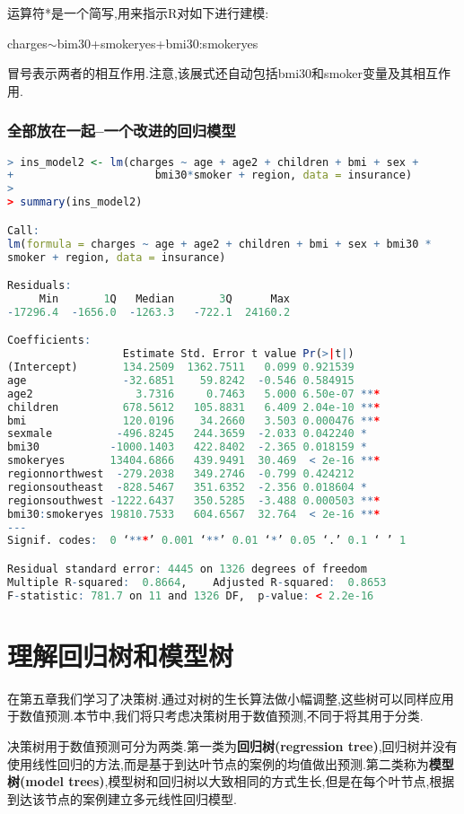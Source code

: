 \documentclass[11pt,a4paper,oneside]{book}
\begin{document}
运算符*是一个简写,用来指示R对如下进行建模:

charges$\sim$bim30+smokeryes+bmi30:smokeryes

冒号表示两者的相互作用.注意,该展式还自动包括bmi30和smoker变量及其相互作用.

\subsubsection{全部放在一起--一个改进的回归模型}

\begin{lstlisting}[language=r]
> ins_model2 <- lm(charges ~ age + age2 + children + bmi + sex +
+                      bmi30*smoker + region, data = insurance)
> 
> summary(ins_model2)

Call:
lm(formula = charges ~ age + age2 + children + bmi + sex + bmi30 * 
smoker + region, data = insurance)

Residuals:
     Min       1Q   Median       3Q      Max 
-17296.4  -1656.0  -1263.3   -722.1  24160.2 

Coefficients:
                  Estimate Std. Error t value Pr(>|t|)    
(Intercept)       134.2509  1362.7511   0.099 0.921539    
age               -32.6851    59.8242  -0.546 0.584915    
age2                3.7316     0.7463   5.000 6.50e-07 ***
children          678.5612   105.8831   6.409 2.04e-10 ***
bmi               120.0196    34.2660   3.503 0.000476 ***
sexmale          -496.8245   244.3659  -2.033 0.042240 *  
bmi30           -1000.1403   422.8402  -2.365 0.018159 *  
smokeryes       13404.6866   439.9491  30.469  < 2e-16 ***
regionnorthwest  -279.2038   349.2746  -0.799 0.424212    
regionsoutheast  -828.5467   351.6352  -2.356 0.018604 *  
regionsouthwest -1222.6437   350.5285  -3.488 0.000503 ***
bmi30:smokeryes 19810.7533   604.6567  32.764  < 2e-16 ***
---
Signif. codes:  0 ‘***’ 0.001 ‘**’ 0.01 ‘*’ 0.05 ‘.’ 0.1 ‘ ’ 1

Residual standard error: 4445 on 1326 degrees of freedom
Multiple R-squared:  0.8664,	Adjusted R-squared:  0.8653 
F-statistic: 781.7 on 11 and 1326 DF,  p-value: < 2.2e-16
\end{lstlisting}
\section{理解回归树和模型树}
在第五章我们学习了决策树.通过对树的生长算法做小幅调整,这些树可以同样应用于数值预测.本节中,我们将只考虑决策树用于数值预测,不同于将其用于分类.

决策树用于数值预测可分为两类.第一类为\textbf{回归树(regression tree)},回归树并没有使用线性回归的方法,而是基于到达叶节点的案例的均值做出预测.第二类称为\textbf{模型树(model trees)},模型树和回归树以大致相同的方式生长,但是在每个叶节点,根据到达该节点的案例建立多元线性回归模型.
\end{document}
